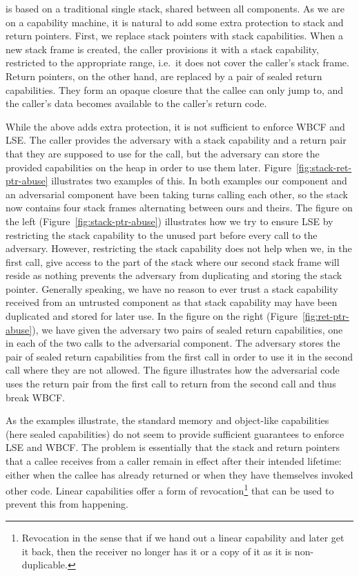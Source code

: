 \documentclass[acmsmall,review,showframe]{acmart}\settopmatter{printfolios=true,printccs=false,printacmref=false}
\begin{document}
\stktokens{} is based on a traditional single stack, shared between all components.
As we are on a capability machine, it is natural to add some extra protection to stack and return pointers.
First, we replace stack pointers with stack capabilities.
When a new stack frame is created, the caller provisions it with a stack capability, restricted to the appropriate range, i.e.\ it does not cover the caller's stack frame.
Return pointers, on the other hand, are replaced by a pair of sealed return capabilities.
They form an opaque closure that the callee can only jump to, and the caller's data becomes available to the caller's return code. 

While the above adds extra protection, it is not sufficient to enforce WBCF and LSE.
The caller provides the adversary with a stack capability and a return pair that they are supposed to use for the call, but the adversary can store the provided capabilities on the heap in order to use them later.
Figure~\ref{fig:stack-ret-ptr-abuse} illustrates two examples of this.
In both examples our component and an adversarial component have been taking turns calling each other, so the stack now contains four stack frames alternating between ours and theirs.
The figure on the left (Figure~\ref{fig:stack-ptr-abuse}) illustrates how we try to ensure LSE by restricting the stack capability to the unused part before every call to the adversary.
However, restricting the stack capability does not help when we, in the first call, give access to the part of the stack where our second stack frame will reside as nothing prevents the adversary from duplicating and storing the stack pointer.
Generally speaking, we have no reason to ever trust a stack capability received from an untrusted component as that stack capability may have been duplicated and stored for later use.
In the figure on the right (Figure~\ref{fig:ret-ptr-abuse}), we have given the adversary two pairs of sealed return capabilities, one in each of the two calls to the adversarial component.
The adversary stores the pair of sealed return capabilities from the first call in order to use it in the second call where they are not allowed.
The figure illustrates how the adversarial code uses the return pair from the first call to return from the second call and thus break WBCF.

As the examples illustrate, the standard memory and object-like capabilities (here sealed capabilities) do not seem to provide sufficient guarantees to enforce LSE and WBCF.
The problem is essentially that the stack and return pointers that a callee receives from a caller remain in effect after their intended lifetime: either when the callee has already returned or when they have themselves invoked other code. 
Linear capabilities offer a form of revocation\footnote{Revocation in the sense that if we hand out a linear capability and later get it back, then the receiver no longer has it or a copy of it as it is non-duplicable.} that can be used to prevent this from happening.
\end{document}
